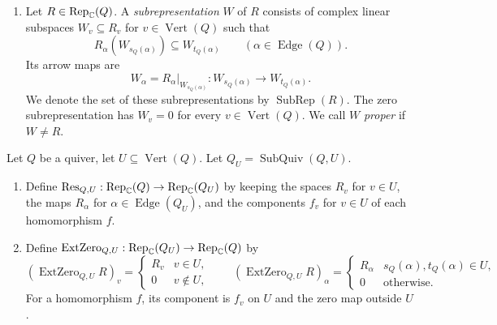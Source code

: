 \begin{definition}
\begin{enumerate}[font=\itshape]
\[
 \phi_{t_Q(\alpha)}\circ R_\alpha
 =R'_\alpha\circ\phi_{s_Q(\alpha)}
 \qquad(\alpha\in\operatorname{Edge}(Q)).
\]
\item Let $R\in\operatorname{Rep}_{\mathbb C}(Q)$.
A \textit{subrepresentation} $W$ of $R$ consists of complex linear subspaces
$W_v\subseteq R_v$ for $v\in\operatorname{Vert}(Q)$ such that
\[
 R_\alpha(W_{s_Q(\alpha)})\subseteq W_{t_Q(\alpha)}
 \qquad(\alpha\in\operatorname{Edge}(Q)).
\]
Its arrow maps are
\[
 W_\alpha=R_\alpha\big|_{W_{s_Q(\alpha)}}:
 W_{s_Q(\alpha)}\longrightarrow W_{t_Q(\alpha)}.
\]
We denote the set of these subrepresentations by $\operatorname{SubRep}(R)$.
The zero subrepresentation has $W_v=0$ for every $v\in\operatorname{Vert}(Q)$.
We call $W$ \textit{proper} if $W\ne R$.
\end{enumerate}
\end{definition}

\begin{definition}\label{def:rep-restriction-zero}
Let $Q$ be a quiver, let $U\subseteq\operatorname{Vert}(Q)$. Let $Q_U=\operatorname{SubQuiv}(Q,U)$.
\begin{enumerate}[font=\itshape]
\item Define
$\operatorname{Res}_{Q,U}:\operatorname{Rep}_{\mathbb C}(Q)\to\operatorname{Rep}_{\mathbb C}(Q_U)$
by keeping the spaces $R_v$ for $v\in U$, the maps $R_\alpha$ for $\alpha\in\operatorname{Edge}(Q_U)$, and the components $f_v$ for $v\in U$ of each homomorphism $f$.
\item Define
$\operatorname{ExtZero}_{Q,U}:\operatorname{Rep}_{\mathbb C}(Q_U)\to\operatorname{Rep}_{\mathbb C}(Q)$
by
\[
 (\operatorname{ExtZero}_{Q,U}R)_v=
 \begin{cases}R_v&v\in U,\\0&v\notin U,\end{cases}
 \qquad
 (\operatorname{ExtZero}_{Q,U}R)_\alpha=
 \begin{cases}R_\alpha&s_Q(\alpha),t_Q(\alpha)\in U,\\0&\text{otherwise}.\end{cases}
\]
For a homomorphism $f$, its component is $f_v$ on $U$ and the zero map outside $U$.
\end{enumerate}
\end{definition}

